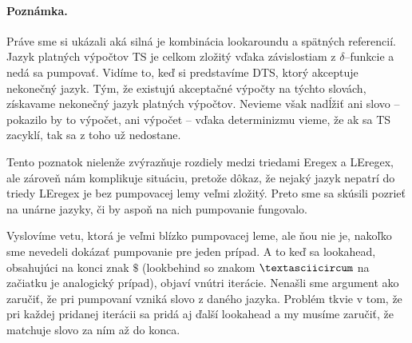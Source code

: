 \paragraph{Poznámka.} Práve sme si ukázali aká silná je kombinácia lookaroundu a spätných referencií. Jazyk platných výpočtov TS je celkom zložitý vďaka závislostiam z $\delta$--funkcie a nedá sa pumpovať. Vidíme to, keď si predstavíme DTS, ktorý akceptuje nekonečný jazyk. Tým, že existujú akceptačné výpočty na týchto slovách, získavame nekonečný jazyk platných výpočtov. Nevieme však nadĺžiť ani slovo -- pokazilo by to výpočet, ani výpočet -- vďaka determinizmu vieme, že ak sa TS zacyklí, tak sa z toho už nedostane.

Tento poznatok nielenže zvýrazňuje rozdiely medzi triedami Eregex a LEregex, ale zároveň nám komplikuje situáciu, pretože dôkaz, že nejaký jazyk nepatrí do triedy LEregex je bez pumpovacej lemy veľmi zložitý. Preto sme sa skúsili pozrieť na unárne jazyky, či by aspoň na nich pumpovanie fungovalo.

Vyslovíme vetu, ktorá je veľmi blízko pumpovacej leme, ale ňou nie je, nakoľko sme nevedeli dokázať pumpovanie pre jeden prípad. A to keď sa lookahead, obsahujúci na konci znak $\mathdollar$ (lookbehind so znakom $\textasciicircum$ na začiatku je analogický prípad), objaví vnútri iterácie. Nenašli sme argument ako zaručiť, že pri pumpovaní vzniká slovo z daného jazyka. Problém tkvie v tom, že pri každej pridanej iterácii sa pridá aj ďalší lookahead a my musíme zaručiť, že matchuje slovo za ním až do konca.

